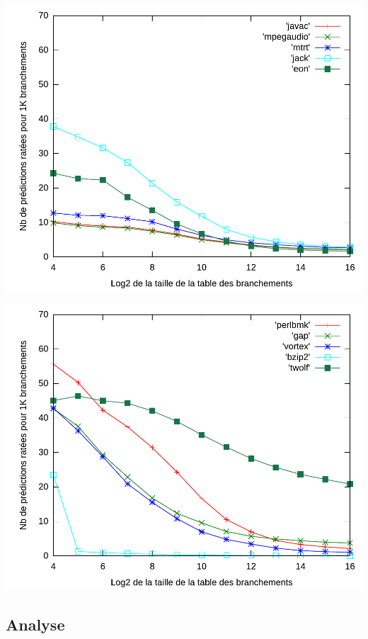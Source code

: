 \documentclass[a4paper]{article}
\begin{document}
\begin{minipage}{.48\linewidth}
\includegraphics[width=\linewidth]{../figures-gshare/gshare-2}
\end{minipage}%
\hfill
\begin{minipage}{.48\linewidth}
\includegraphics[width=\linewidth]{../figures-gshare/gshare-3}
\end{minipage}
\subsection{Analyse}
\end{document}
